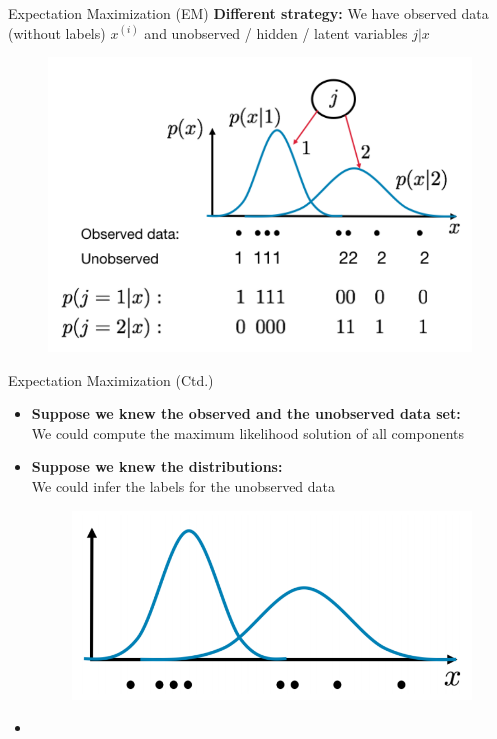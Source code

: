 \begin{frame}{Expectation Maximization (EM)}{}
	\textbf{Different strategy:} We have observed data (without labels) $x^{(i)}$ and unobserved / hidden / latent variables $j \vert x$

	\begin{figure}
		\centering
		\includegraphics[scale=0.3]{04_density_estimation/02_img/em_1}
	\end{figure}
\end{frame}


\begin{frame}{Expectation Maximization (Ctd.)}{}
	\begin{itemize}
		\item \textbf{Suppose we knew the observed and the unobserved data set:} \\
			We could compute the maximum likelihood solution of all components
		\item \textbf{Suppose we knew the distributions:} \\
			We could infer the labels for the unobserved data
		\begin{figure}
			\centering
			\includegraphics[scale=0.3]{04_density_estimation/02_img/em_2}
		\end{figure}
		\item {}
	\end{itemize}
\end{frame}


